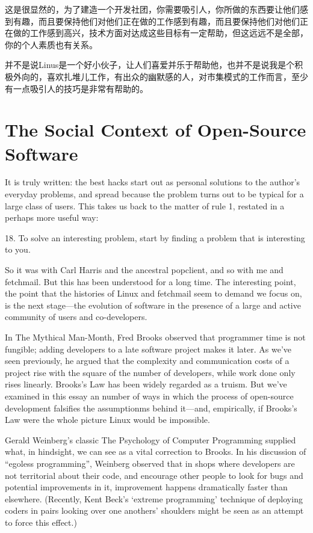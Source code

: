 \documentclass[a4paper,12pt,UTF8,twoside]{ctexbook}
\begin{document}
这是很显然的，为了建造一个开发社团，你需要吸引人，你所做的东西要让他们感到有趣，而且要保持他们对他们正在做的工作感到有趣，而且要保持他们对他们正在做的工作感到高兴，技术方面对达成这些目标有一定帮助，但这远远不是全部，你的个人素质也有关系。


并不是说Linus是一个好小伙子，让人们喜爱并乐于帮助他，也并不是说我是个积极外向的，喜欢扎堆儿工作，有出众的幽默感的人，对市集模式的工作而言，至少有一点吸引人的技巧是非常有帮助的。

\chapter{The Social Context of Open-Source Software}

It is truly written: the best hacks start out as personal solutions to the author's everyday problems, and spread because the problem turns out to be typical for a large class of users. This takes us back to the matter of rule 1, restated in a perhaps more useful way:

18. To solve an interesting problem, start by finding a problem that is interesting to you.

So it was with Carl Harris and the ancestral popclient, and so with me and fetchmail. But this has been understood for a long time. The interesting point, the point that the histories of Linux and fetchmail seem to demand we focus on, is the next stage—the evolution of software in the presence of a large and active community of users and co-developers.

In The Mythical Man-Month, Fred Brooks observed that programmer time is not fungible; adding developers to a late software project makes it later. As we've seen previously, he argued that the complexity and communication costs of a project rise with the square of the number of developers, while work done only rises linearly. Brooks's Law has been widely regarded as a truism. But we've examined in this essay an number of ways in which the process of open-source development falsifies the assumptionms behind it—and, empirically, if Brooks's Law were the whole picture Linux would be impossible.

Gerald Weinberg's classic The Psychology of Computer Programming supplied what, in hindsight, we can see as a vital correction to Brooks. In his discussion of ``egoless programming'', Weinberg observed that in shops where developers are not territorial about their code, and encourage other people to look for bugs and potential improvements in it, improvement happens dramatically faster than elsewhere. (Recently, Kent Beck's `extreme programming' technique of deploying coders in pairs looking over one anothers' shoulders might be seen as an attempt to force this effect.)
\end{document}
